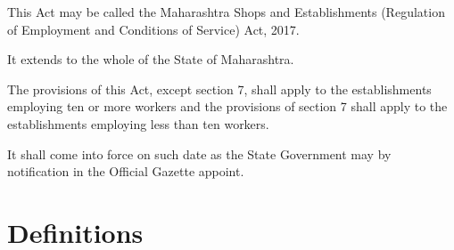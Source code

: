 \documentclass[gaz8]{mhact}
\begin{document}
\begin{subsectionlist}
\item This Act may be called the Maharashtra Shops and Establishments
(Regulation of Employment and Conditions of Service) Act, 2017.
\item It extends to the whole of the State of Maharashtra.
\item The provisions of this Act, except section 7, shall apply to the
establishments employing ten or more workers and the provisions of section
7 shall apply to the establishments employing less than ten workers.
\item It shall come into force on such date as the State Government may by
notification in the Official Gazette appoint.
\end{subsectionlist}


\section{Definitions}
\end{document}
